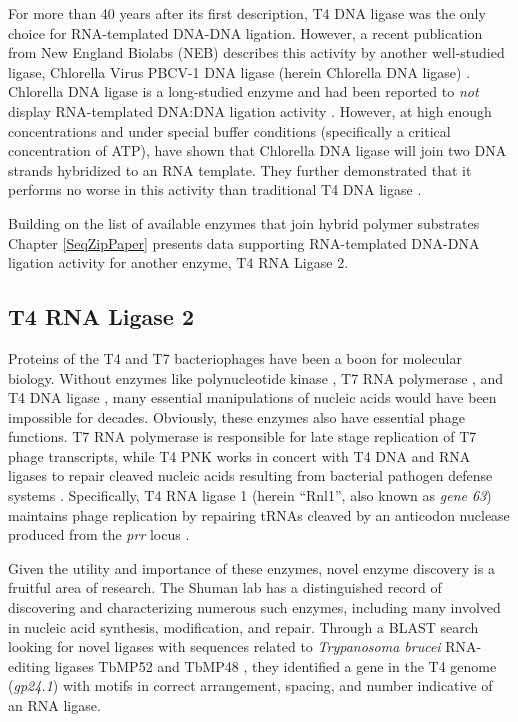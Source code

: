     For more than 40 years after its first description, T4 DNA ligase was the only choice for RNA-templated DNA-DNA ligation. However, a recent publication from New England Biolabs (NEB) describes this activity by another well-studied ligase, Chlorella Virus PBCV-1 DNA ligase (herein Chlorella DNA ligase) \citep{Lohman2013c}. Chlorella DNA ligase is a long-studied enzyme and had been reported to \textit{not} display RNA-templated DNA:DNA ligation activity \citep{Ho1997b,Sriskanda1998c}. However, at high enough concentrations and under special buffer conditions (specifically a critical concentration of ATP), \citet{Lohman2013c} have shown that Chlorella DNA ligase will join two DNA strands hybridized to an RNA template. They further demonstrated that it performs no worse in this activity than traditional T4 DNA ligase \citep{Nilsson2001,Yeakley2002}.

    Building on the list of available enzymes that join hybrid polymer substrates Chapter \ref{SeqZipPaper} presents data supporting RNA-templated DNA-DNA ligation activity for another enzyme, T4 RNA Ligase 2.

  \subsection{T4 RNA Ligase 2}
    \label{Intro:subsec:Rnl2}

    Proteins of the T4 and T7 bacteriophages have been a boon for molecular biology. Without enzymes like polynucleotide kinase \citep{Richardson1965a}, T7 RNA polymerase \citep{Summers1970b}, and T4 DNA ligase \citep{Weiss1967a}, many essential manipulations of nucleic acids would have been impossible for decades. Obviously, these enzymes also have essential phage functions. T7 RNA polymerase is responsible for late stage replication of T7 phage transcripts, while T4 PNK works in concert with T4 DNA and RNA ligases to repair cleaved nucleic acids resulting from bacterial pathogen defense systems \citep{Wang2002b}. Specifically, T4 RNA ligase 1 (herein ``Rnl1'', also known as \textit{gene 63}) maintains phage replication by repairing tRNAs cleaved by an anticodon nuclease produced from the \textit{prr} locus \citep{Amitsur1987d}.

    Given the utility and importance of these enzymes, novel enzyme discovery is a fruitful area of research. The Shuman lab has a distinguished record of discovering and characterizing numerous such enzymes, including many involved in nucleic acid synthesis, modification, and repair. Through a BLAST search looking for novel ligases with sequences related to \textit{Trypanosoma brucei} RNA-editing ligases TbMP52 and TbMP48 \citep{Ho2002b}, they identified a gene in the T4 genome (\textit{gp24.1}) with motifs in correct arrangement, spacing, and number indicative of an RNA ligase.

